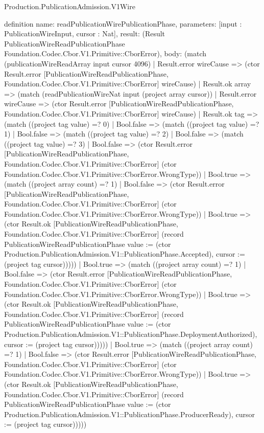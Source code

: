 \begin{lexlean}{Production.PublicationAdmission.V1Wire}
\begin{semanticmodule}
definition{
  name: readPublicationWirePublicationPhase,
  parameters: [input : PublicationWireInput, cursor : Nat],
  result: (Result PublicationWireReadPublicationPhase Foundation.Codec.Cbor.V1.Primitive::CborError),
  body: (match (publicationWireReadArray input cursor 4096)
    | Result.error wireCause => (ctor Result.error [PublicationWireReadPublicationPhase, Foundation.Codec.Cbor.V1.Primitive::CborError] wireCause)
    | Result.ok array => (match (readPublicationWireNat input (project array cursor))
      | Result.error wireCause => (ctor Result.error [PublicationWireReadPublicationPhase, Foundation.Codec.Cbor.V1.Primitive::CborError] wireCause)
      | Result.ok tag => (match ((project tag value) =? 0)
        | Bool.false => (match ((project tag value) =? 1)
          | Bool.false => (match ((project tag value) =? 2)
            | Bool.false => (match ((project tag value) =? 3)
              | Bool.false => (ctor Result.error [PublicationWireReadPublicationPhase, Foundation.Codec.Cbor.V1.Primitive::CborError] (ctor Foundation.Codec.Cbor.V1.Primitive::CborError.WrongType))
              | Bool.true => (match ((project array count) =? 1)
                | Bool.false => (ctor Result.error [PublicationWireReadPublicationPhase, Foundation.Codec.Cbor.V1.Primitive::CborError] (ctor Foundation.Codec.Cbor.V1.Primitive::CborError.WrongType))
                | Bool.true => (ctor Result.ok [PublicationWireReadPublicationPhase, Foundation.Codec.Cbor.V1.Primitive::CborError] (record PublicationWireReadPublicationPhase {value := (ctor Production.PublicationAdmission.V1::PublicationPhase.Accepted), cursor := (project tag cursor)}))))
            | Bool.true => (match ((project array count) =? 1)
              | Bool.false => (ctor Result.error [PublicationWireReadPublicationPhase, Foundation.Codec.Cbor.V1.Primitive::CborError] (ctor Foundation.Codec.Cbor.V1.Primitive::CborError.WrongType))
              | Bool.true => (ctor Result.ok [PublicationWireReadPublicationPhase, Foundation.Codec.Cbor.V1.Primitive::CborError] (record PublicationWireReadPublicationPhase {value := (ctor Production.PublicationAdmission.V1::PublicationPhase.DeploymentAuthorized), cursor := (project tag cursor)}))))
          | Bool.true => (match ((project array count) =? 1)
            | Bool.false => (ctor Result.error [PublicationWireReadPublicationPhase, Foundation.Codec.Cbor.V1.Primitive::CborError] (ctor Foundation.Codec.Cbor.V1.Primitive::CborError.WrongType))
            | Bool.true => (ctor Result.ok [PublicationWireReadPublicationPhase, Foundation.Codec.Cbor.V1.Primitive::CborError] (record PublicationWireReadPublicationPhase {value := (ctor Production.PublicationAdmission.V1::PublicationPhase.ProducerReady), cursor := (project tag cursor)}))))
}
\end{semanticmodule}
\end{lexlean}
